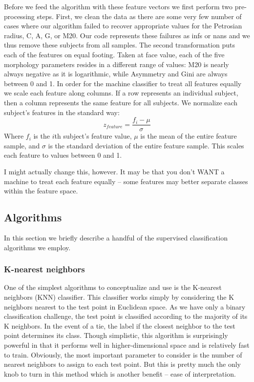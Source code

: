 \documentclass[twocolumn]{aastex6}
\begin{document}
Before we feed the algorithm with these feature vectors we first perform two pre-processing steps. First, we clean the data as there are some very few number of cases where our algorithm failed to recover appropriate values for the Petrosian radius, C, A, G, or M20. Our code represents these failures as infs or nans and we thus remove these subjects from all samples.  The second transformation puts each of the features on equal footing. Taken at face value, each of the five morphology parameters resides in a different range of values:  M20 is nearly always negative as it is logarithmic, while Asymmetry and Gini are always between 0 and 1.  In order for the machine classifier to treat all features equally we scale each feature along columns. If a row represents an individual subject, then a column represents the same feature for all subjects. We normalize each subject's features in the standard way: 
\begin{equation}
z_{feature} = \frac{f_i - \mu}{\sigma}
\end{equation} 
Where $f_i$ is the $i$th subject's feature value, $\mu$ is the mean of the entire feature sample, and $\sigma$ is the standard deviation of the entire feature sample. This scales each feature to values between 0 and 1. 

I might actually change this, however. It may be that you don't WANT a machine to treat each feature equally -- some features may better separate classes within the feature space. 


\subsection{Algorithms}
In this section we briefly describe a handful of the supervised classification algorithms we employ. 



\subsubsection{K-nearest neighbors}
One of the simplest algorithms to conceptualize and use is the K-nearest neighbors (KNN) classifier. This classifier works simply by considering the K neighbors nearest to the test point in Euclidean space. As we have only a binary classification challenge, the test point is classified according to the majority of its K neighbors. In the event of a tie, the label if the closest neighbor to the test point determines its class. Though simplistic, this algorithm is surprisingly powerful in that it performs well in higher-dimensional space and is relatively fast to train. Obviously, the most important parameter to consider is the number of nearest neighbors to assign to each test point. But this is pretty much the only knob to turn in this method which is another benefit -- ease of interpretation. 
\end{document}
